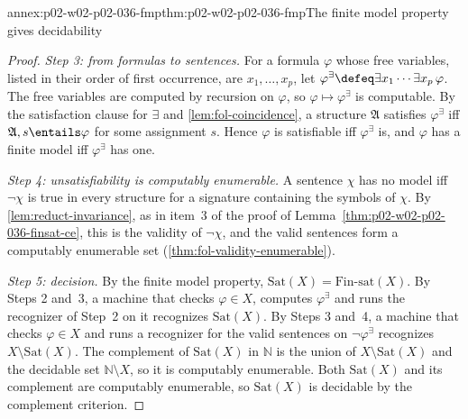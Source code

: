 \begin{annexitem}{annex:p02-w02-p02-036-fmp}{thm:p02-w02-p02-036-fmp}{The finite model property gives decidability}
\begin{proof}
\emph{Step 3: from formulas to sentences.}  For a formula \(\varphi\) whose free
variables, listed in their order of first occurrence, are \(x_1,\ldots,x_p\),
let \(\varphi^{\exists}\defeq\exists x_1\cdots\exists x_p\,\varphi\).  The free
variables are computed by recursion on \(\varphi\), so
\(\varphi\mapsto\varphi^{\exists}\) is computable.  By the satisfaction clause
for \(\exists\) and \cref{lem:fol-coincidence}, a structure \(\mathfrak A\)
satisfies \(\varphi^{\exists}\) iff \(\mathfrak A,s\entails\varphi\) for some
assignment \(s\).  Hence \(\varphi\) is satisfiable iff \(\varphi^{\exists}\)
is, and \(\varphi\) has a finite model iff \(\varphi^{\exists}\) has one.

\emph{Step 4: unsatisfiability is computably enumerable.}  A sentence \(\chi\)
has no model iff \(\neg\chi\) is true in every structure for a signature
containing the symbols of \(\chi\).  By \cref{lem:reduct-invariance}, as in
item~3 of the proof of Lemma~\ref{thm:p02-w02-p02-036-finsat-ce}, this is the
validity of \(\neg\chi\), and the valid sentences form a computably enumerable
set (\cref{thm:fol-validity-enumerable}).

\emph{Step 5: decision.}  By the finite model property,
\(\mathrm{Sat}(X)=\mathrm{Fin\text{-}sat}(X)\).  By Steps 2 and~3, a machine
that checks \(\varphi\in X\), computes \(\varphi^{\exists}\) and runs the
recognizer of Step~2 on it recognizes \(\mathrm{Sat}(X)\).  By Steps 3 and~4,
a machine that checks \(\varphi\in X\) and runs a recognizer for the valid
sentences on \(\neg\varphi^{\exists}\) recognizes \(X\setminus\mathrm{Sat}(X)\).
The complement of \(\mathrm{Sat}(X)\) in \(\mathbb N\) is the union of
\(X\setminus\mathrm{Sat}(X)\) and the decidable set \(\mathbb N\setminus X\), so
it is computably enumerable.  Both \(\mathrm{Sat}(X)\) and its complement are
computably enumerable, so \(\mathrm{Sat}(X)\) is decidable by the complement
criterion.
\end{proof}
\end{annexitem}

